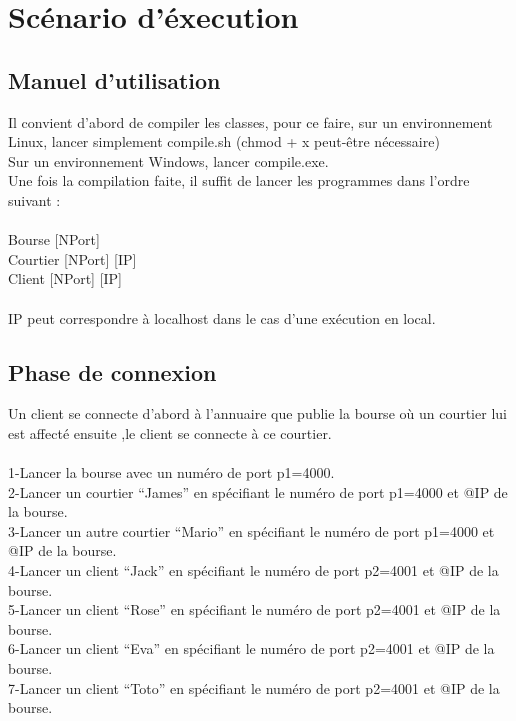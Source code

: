 \documentclass[11pt]{article}
\begin{document}
\section{Scénario d'éxecution}



\subsection {Manuel d'utilisation}

Il convient d'abord de compiler les classes, pour ce faire, sur un environnement Linux, lancer simplement compile.sh (chmod + x peut-être nécessaire)\\
Sur un environnement Windows, lancer compile.exe. \\
Une fois la compilation faite, il suffit de lancer les programmes dans l'ordre suivant : \\ \\
Bourse [NPort] \\
Courtier [NPort] [IP] \\
Client [NPort] [IP] \\ \\
IP peut correspondre à localhost dans le cas d'une exécution en local.

\subsection {Phase de connexion}

Un client se connecte d’abord à l’annuaire que publie la bourse où un courtier lui est affecté ensuite ,le client se connecte  à ce courtier. \\ \\
1-Lancer la bourse avec un numéro de port p1=4000. \\
2-Lancer un courtier “James” en spécifiant le numéro de port p1=4000 et @IP de la bourse.\\
3-Lancer un autre courtier “Mario” en spécifiant  le numéro de port p1=4000 et @IP de la bourse.\\
4-Lancer un client “Jack” en spécifiant le numéro de port p2=4001 et @IP de la bourse.\\
5-Lancer un client “Rose” en spécifiant le numéro de port p2=4001 et @IP de la bourse.\\
6-Lancer un client “Eva” en spécifiant le numéro de port p2=4001 et @IP de la bourse.\\
7-Lancer un client “Toto” en spécifiant le numéro de port p2=4001 et @IP de la bourse.\\ 
\end{document}
